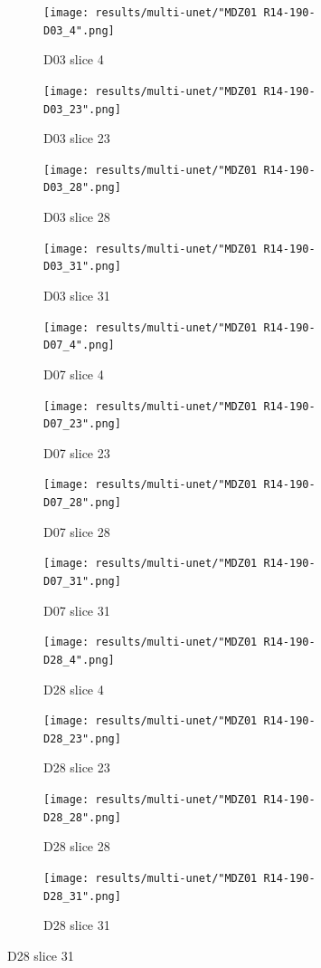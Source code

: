 \begin{figure}[!htb]  
    \centering %
\begin{subfigure}{0.25\textwidth}
  \texttt{[image: results/multi-unet/"MDZ01 R14-190-D03\_4".png]}
  \caption{D03 slice 4}
\end{subfigure}\hfil %
\begin{subfigure}{0.25\textwidth}
  \texttt{[image: results/multi-unet/"MDZ01 R14-190-D03\_23".png]}
  \caption{D03 slice 23}
\end{subfigure}\hfil %
\begin{subfigure}{0.25\textwidth}
  \texttt{[image: results/multi-unet/"MDZ01 R14-190-D03\_28".png]}
  \caption{D03 slice 28}
\end{subfigure}\hfil %
\begin{subfigure}{0.25\textwidth}
  \texttt{[image: results/multi-unet/"MDZ01 R14-190-D03\_31".png]}
  \caption{D03 slice 31}
\end{subfigure}

\medskip
\begin{subfigure}{0.25\textwidth}
  \texttt{[image: results/multi-unet/"MDZ01 R14-190-D07\_4".png]}
  \caption{D07 slice 4}
\end{subfigure}\hfil %
\begin{subfigure}{0.25\textwidth}
  \texttt{[image: results/multi-unet/"MDZ01 R14-190-D07\_23".png]}
  \caption{D07 slice 23}
\end{subfigure}\hfil %
\begin{subfigure}{0.25\textwidth}
  \texttt{[image: results/multi-unet/"MDZ01 R14-190-D07\_28".png]}
  \caption{D07 slice 28}
\end{subfigure}\hfil %
\begin{subfigure}{0.25\textwidth}
  \texttt{[image: results/multi-unet/"MDZ01 R14-190-D07\_31".png]}
  \caption{D07 slice 31}
\end{subfigure}

\medskip
\begin{subfigure}{0.25\textwidth}
  \texttt{[image: results/multi-unet/"MDZ01 R14-190-D28\_4".png]}
  \caption{D28 slice 4}
\end{subfigure}\hfil %
\begin{subfigure}{0.25\textwidth}
  \texttt{[image: results/multi-unet/"MDZ01 R14-190-D28\_23".png]}
  \caption{D28 slice 23}
\end{subfigure}\hfil %
\begin{subfigure}{0.25\textwidth}
  \texttt{[image: results/multi-unet/"MDZ01 R14-190-D28\_28".png]}
  \caption{D28 slice 28}
\end{subfigure}\hfil %
\begin{subfigure}{0.25\textwidth}
  \texttt{[image: results/multi-unet/"MDZ01 R14-190-D28\_31".png]}
  \caption{D28 slice 31}
\end{subfigure}
  

\end{figure}
